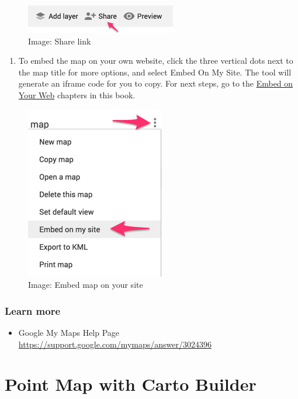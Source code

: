 \documentclass[
  english,
]{book}
\providecommand{\tightlist}{%
  \setlength{\itemsep}{0pt}\setlength{\parskip}{0pt}}
\begin{document}
\begin{figure}
\centering
\includegraphics{images/06-map/mymaps-share.png}
\caption{Image: Share link}
\end{figure}

\begin{enumerate}
\def\labelenumi{\arabic{enumi})}
\setcounter{enumi}{9}
\tightlist
\item
  To embed the map on your own website, click the three vertical dots next to the map title for more options, and select Embed On My Site. The tool will generate an iframe code for you to copy. For next steps, go to the \href{embed.html}{Embed on Your Web} chapters in this book.
\end{enumerate}

\begin{figure}
\centering
\includegraphics{images/06-map/mymaps-embed.png}
\caption{Image: Embed map on your site}
\end{figure}

\hypertarget{learn-more-12}{%
\subsubsection*{Learn more}\label{learn-more-12}}

\begin{itemize}
\tightlist
\item
  Google My Maps Help Page \url{https://support.google.com/mymaps/answer/3024396}
\end{itemize}

\hypertarget{carto}{%
\section{Point Map with Carto Builder}\label{carto}}
\end{document}
